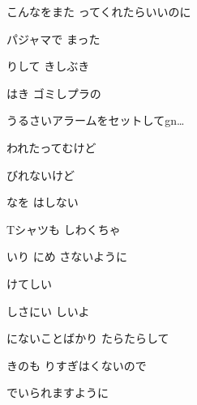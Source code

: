 \documentclass[a4paper,tate,twocolumn,12pt]{ltjtarticle}
\begin{document}
\begin{flushleft}
\begin{minipage}{\linewidth}
こんなをまた ってくれたらいいのに
\end{minipage}

\vspace{2em}

\noindent\begin{minipage}{\linewidth}
パジャマで まった

りして きしぶき

はき ゴミしプラの

うるさいアラームをセットしてgn…
\end{minipage}

\vspace{2em}

\noindent\begin{minipage}{\linewidth}
われたってむけど

びれないけど

なを はしない

Tシャツも しわくちゃ

いり にめ さないように

けてしい 

しさにい しいよ

にないことばかり たらたらして

きのも りすぎはくないので

でいられますように
\end{minipage}

\end{flushleft}
\end{document}
